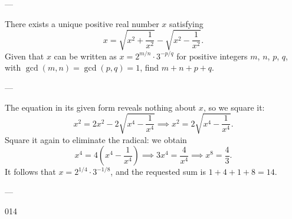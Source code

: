 
---

There exists a unique positive real number $x$ satisfying\[x=\sqrt{x^2+\frac1{x^2}}-\sqrt{x^2-\frac1{x^2}}.\]Given that $x$ can be written as $x=2^{m/n}\cdot3^{-p/q}$ for positive integers $m$, $n$, $p$, $q$, with $\gcd(m,n)=\gcd(p,q)=1$, find $m+n+p+q$. 

---

The equation in its given form reveals nothing about $x$, so we square it: \[x^2=2x^2-2\sqrt{x^4-\frac1{x^4}}\implies x^2=2\sqrt{x^4-\frac1{x^4}}.\]
Square it again to eliminate the radical: we obtain \[x^4=4\left(x^4-\frac1{x^4}\right)\implies3x^4=\frac4{x^4}\implies x^8=\frac43.\]
It follows that $x=2^{1/4}\cdot3^{-1/8}$, and the requested sum is $1+4+1+8=14$.

---

014
